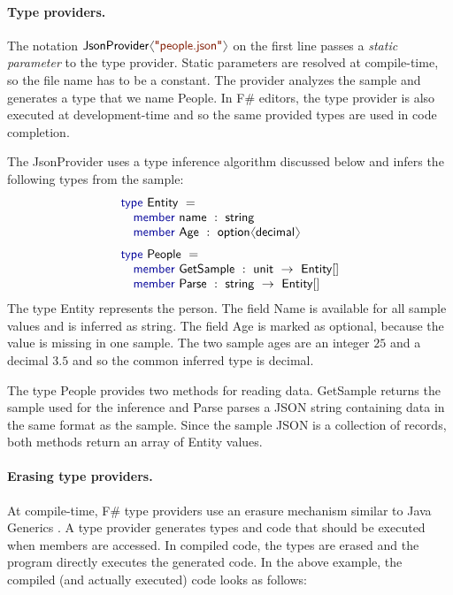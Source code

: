 \documentclass[preprint]{sigplanconf}
\newcommand{\langl}{\begin{picture}(4.5,7)
\put(1.1,2.5){\rotatebox{60}{\line(1,0){5.5}}}
\put(1.1,2.5){\rotatebox{300}{\line(1,0){5.5}}}
\end{picture}}
\newcommand{\rangl}{\begin{picture}(4.5,7)
\put(.9,2.5){\rotatebox{120}{\line(1,0){5.5}}}
\put(.9,2.5){\rotatebox{240}{\line(1,0){5.5}}}
\end{picture}}
\newcommand{\kvd}[1]{\textnormal{\textcolor{kvdclr}{\sffamily #1}}}
\newcommand{\str}[1]{\textnormal{\textcolor{strclr}{\sffamily "#1"}}}
\newcommand{\ident}[1]{\textnormal{\sffamily #1}}
\begin{document}
\paragraph{Type providers.}
The notation $\ident{JsonProvider}\langl\str{people.json}\rangl$ on the first line passes a
\emph{static parameter} to the type provider. Static parameters are resolved at compile-time,
so the file name has to be a constant. The provider analyzes the sample and generates
a type that we name \ident{People}. In F\# editors, the type provider is also executed at
development-time and so the same provided types are used in code completion.

The \ident{JsonProvider} uses a type inference algorithm discussed below and infers the
following types from the sample:
%
\begin{equation*}
\begin{array}{l}
 \kvd{type}~\ident{Entity}~=  \\
 \quad \kvd{member}~\ident{name}~:~\ident{string} \\
 \quad \kvd{member}~\ident{Age}~:~\ident{option}\langl \ident{decimal}\rangl \\[0.6em]
 \kvd{type}~\ident{People}~=  \\
 \quad \kvd{member}~\ident{GetSample}~:~\ident{unit}~\rightarrow~\ident{Entity}[] \\
 \quad \kvd{member}~\ident{Parse}~:~\ident{string}~\rightarrow~\ident{Entity}[] \\
\end{array}
\end{equation*}
%
The type \ident{Entity} represents the person. The field \ident{Name} is available for all
sample values and is inferred as \ident{string}. The field \ident{Age} is marked as optional,
because the value is missing in one sample. The two sample ages are an integer $25$ and a
decimal $3.5$ and so the common inferred type is \ident{decimal}.

The type \ident{People} provides two methods for reading data. \ident{GetSample} returns the
sample used for the inference and \ident{Parse} parses a JSON string containing data in the same
format as the sample. Since the sample JSON is a collection of records, both methods return an
array of \ident{Entity} values.

\paragraph{Erasing type providers.}
At compile-time, F\# type providers use an erasure mechanism similar to Java Generics \cite{java-erasure}.
A type provider generates types and code that should be executed when members are accessed. In compiled
code, the types are erased and the program directly executes the generated code.
In the above example, the compiled (and actually executed) code looks as follows:
\end{document}

